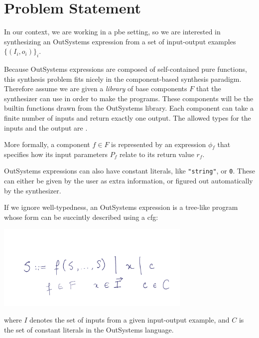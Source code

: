 \section{Problem Statement}
\label{sec:problem-statement}

In our context, we are working in a \gls{pbe} setting, so we are interested in
synthesizing an OutSystems expression from a set of input-output examples
$\{(I_i, o_i)\}_i$.

Because OutSystems expressions are composed of self-contained pure functions,
this synthesis problem fits nicely in the component-based synthesis paradigm.
Therefore assume we are given a \textit{library} of base components $F$ that the
synthesizer can use in order to make the programs. These components will be the
builtin functions drawn from the OutSystems library. Each component can take a
finite number of inputs and return exactly one output. The allowed types for the
inputs and the output are .

More formally, a component $f \in F$ is represented by an expression
$\phi{}_f$ that specifies how its input parameters $P_f$ relate to its
return value $r_f$.


OutSystems expressions can also have constant literals, like
\lstinline{"string"}, or \lstinline{0}. These can either be given by the user as
extra information, or figured out automatically by the synthesizer.

If we ignore well-typedness, an OutSystems expression is a tree-like program
whose form can be succintly described using a \gls{cfg}:

\begin{center}
  \includegraphics[width=0.7\textwidth]{assets/cfg-expressions.png}
\end{center}


where $I$ denotes the set of inputs from a given input-output example, and
$C$ is the set of constant literals in the OutSystems language.


